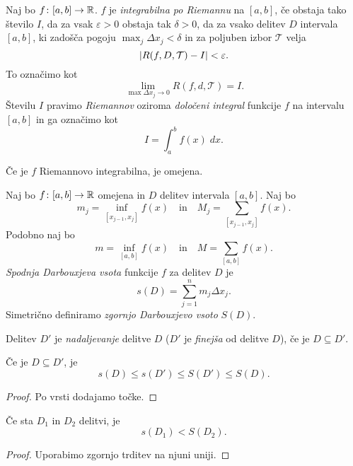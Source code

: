 \documentclass[12pt, a4paper]{article}
\begin{document}
\begin{okvir}
\begin{definicija}
Naj bo $f\colon[a,b]\to\mathbb{R}$. $f$ je \emph{integrabilna po Riemannu} na $[a,b]$, če obstaja tako število $I$, da za vsak $\varepsilon>0$ obstaja tak $\delta>0$, da za vsako delitev $D$ intervala $[a,b]$, ki zadošča pogoju $\displaystyle\max_{j}\Delta x_j<\delta$ in za poljuben izbor $\mathcal{T}$ velja
\[
\left\lvert R(f,D,\mathcal{T})-I\right\rvert<\varepsilon.
\]
To označimo kot
\[
\lim_{\max \Delta x_j\to 0} R(f,d,\mathcal{T})=I.
\]
Številu $I$ pravimo \emph{Riemannov} oziroma \emph{določeni integral} funkcije $f$ na intervalu $[a,b]$ in ga označimo kot
\[
I=\int_a^b f(x)\;dx.
\]
\end{definicija}
\end{okvir}

\begin{opomba}
Če je $f$ Riemannovo integrabilna, je omejena.
\end{opomba}

\begin{definicija}
Naj bo $f\colon[a,b]\to\mathbb{R}$ omejena in $D$ delitev intervala $[a,b]$. Naj bo 
\[
m_j=\inf_{[x_{j-1},x_j]} f(x)\quad\text{in}\quad M_j=\sum_{[x_{j-1},x_j]} f(x).
\]
Podobno naj bo
\[
m=\inf_{[a,b]} f(x)\quad\text{in}\quad M=\sum_{[a,b]} f(x).
\]
\emph{Spodnja Darbouxjeva vsota} funkcije $f$ za delitev $D$ je
\[
s(D)=\sum_{j=1}^n m_j\Delta x_j.
\]
Simetrično definiramo \emph{zgornjo Darbouxjevo vsoto} $S(D)$.
\end{definicija}

\begin{definicija}
Delitev $D'$ je \emph{nadaljevanje} delitve $D$ ($D'$ je \emph{finejša} od delitve $D$), če je $D\subseteq D'$.
\end{definicija}

\begin{trditev}
Če je $D\subseteq D'$, je
\[
s(D)\leq s(D')\leq S(D')\leq S(D).
\]
\end{trditev}

\begin{proof}
Po vrsti dodajamo točke.
\end{proof}

\begin{posledica}
Če sta $D_1$ in $D_2$ delitvi, je
\[
s(D_1)<S(D_2).
\]
\end{posledica}

\begin{proof}
Uporabimo zgornjo trditev na njuni uniji.
\end{proof}
\end{document}
